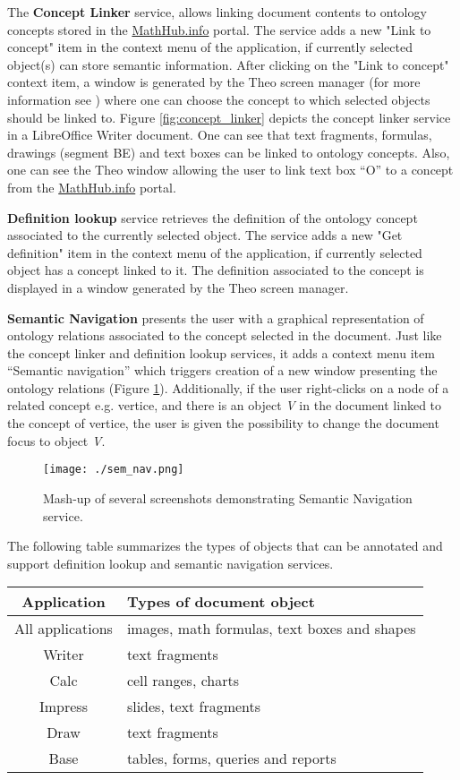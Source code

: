 \documentclass{llncs}
\begin{document}
The \textbf{Concept Linker} service, allows linking document contents to ontology concepts stored in the \url{MathHub.info}\cite{IanJucKoh:sdm14} portal. The service adds a new "Link to concept" item in the context menu of the application, if currently selected object(s) can store semantic information. After clicking on the "Link to concept" context item, a window is generated by the Theo screen manager (for more information see \cite{DavJucKoh:safusa12}) where one can choose the concept to which selected objects should be linked to. Figure \ref{fig:concept_linker} depicts the concept linker service in a LibreOffice Writer document. One can see that text fragments, formulas, drawings (segment BE) and text boxes can be linked to ontology concepts. Also, one can see the Theo window allowing the user to link text box ``O'' to a concept from the \url{MathHub.info} portal.

\textbf{Definition lookup} service retrieves the definition of the ontology concept associated to the currently selected object. The service adds a new "Get definition" item in the context menu of the application, if currently selected object has a concept linked to it. The definition associated to the concept is displayed in a window generated by the Theo screen manager. 

\textbf{Semantic Navigation} presents the user with a graphical representation of ontology relations associated to the concept selected in the document. Just like the concept linker and definition lookup services, it adds a context menu item ``Semantic navigation'' which triggers creation of a new window presenting the ontology relations (Figure \ref{fig:sem_nav}). Additionally, if the user right-clicks on a node of a related concept e.g. vertice, and there is an object \textit{V} in the document linked to the concept of vertice, the user is given the possibility to change the document focus to object \textit{V}. 

\begin{figure}
\centering
\texttt{[image: ./sem\_nav.png]}
\caption{Mash-up of several screenshots demonstrating Semantic Navigation service. }
\label{fig:sem_nav}
\end{figure}

The following table summarizes the types of objects that can be annotated and support definition lookup and semantic navigation services.
\begin{center}
\begin{tabular}{|c|p{9cm}|}
\hline Application & Types of document object\\ 
\hline All applications & images, math formulas, text boxes and shapes \\
\hline Writer & text fragments \\ 
\hline Calc & cell ranges, charts \\ 
\hline Impress & slides, text fragments \\ 
\hline Draw & text fragments \\
\hline Base & tables, forms, queries and reports\\
\hline 
\end{tabular} 
\end{center} 
\end{document}
